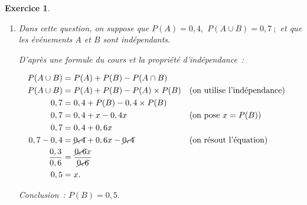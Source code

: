 \documentclass[10pt]{article}
\newtheorem{exo}{Exercice}
\begin{document}
\begin{exo}
\begin{enumerate}
\begin{enumerate}
\end{enumerate}
\item Dans cette question, on suppose que $P(A)=0,4,$ $P(A\cup B)=0,7~;$ et que les événements $A$ et $B$ sont indépendants.

\medskip

D'après une formule du cours et la propriété d'indépendance~:

\begin{align*}
P(A\cup B)&=P(A)+P(B)-P(A\cap B)\\
P(A\cup B)&=P(A)+P(B)-P(A)\times P(B)&&(\text{on utilise l'indépendance})\\
0,7&=0,4+P(B)-0,4 \times P(B)\\
0,7&=0,4+x-0,4 x&&(\text{on pose }x=P(B))\\
0,7&=0,4+0,6 x\\
0,7-0,4&=\cancel{0,4}+0,6x-\cancel{0,4}&&(\text{on résout l'équation})\\
\frac{0,3}{0,6}&=\frac{\cancel{0,6}x}{\cancel{0,6}}\\
0,5&=x.\end{align*}

Conclusion~: $P(B)=0,5.$

\end{enumerate}

\end{exo}
\end{document}
